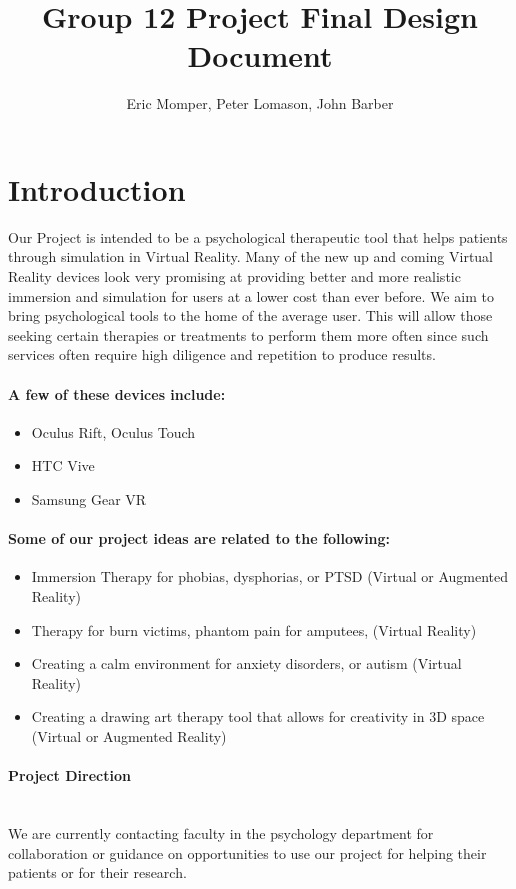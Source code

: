\documentclass[a4paper,10pt,twoside]{article}
\title{Group 12 Project Final Design Document}
\author{Eric Momper, Peter Lomason, John Barber}
\begin{document}
	
\maketitle
	
	\pagebreak
	\tableofcontents
	\pagebreak
	
	\section{Introduction}
		Our Project is intended to be a psychological therapeutic tool that helps patients through simulation in Virtual Reality.
	Many of the new up and coming Virtual Reality devices look very promising at providing better and more realistic immersion and simulation for users at a lower cost than ever before. We aim to bring psychological tools to the home of the average user. This will allow those seeking certain therapies or treatments to perform them more often since such services often require high diligence and repetition to produce results.
	
	\paragraph{A few of these devices include:}
	\begin{itemize}
		\item Oculus Rift, Oculus Touch
		\item HTC Vive
		\item Samsung Gear VR
	\end{itemize}
	
	\paragraph{ Some of our project ideas are related to the following:}
	\begin{itemize}
		\item ​Immersion Therapy for phobias, dysphorias, or PTSD (Virtual or Augmented Reality)
		\item Therapy for burn victims, phantom pain for amputees,  (Virtual Reality)
		\item Creating a calm environment for  anxiety disorders, or autism (Virtual Reality)
		\item Creating a drawing art therapy tool that allows for creativity in 3D space (Virtual or Augmented Reality)
	\end{itemize}
	
	
	\paragraph{Project Direction} ~\\ We are currently contacting faculty in the psychology department for collaboration or guidance on opportunities to use our project for helping their patients or for their research.
\end{document}

